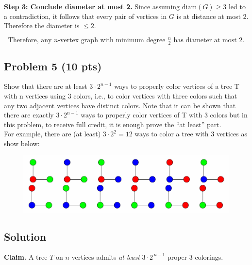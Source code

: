\documentclass[12pt]{article}
\begin{document}
\bigskip
\textbf{Step 3: Conclude diameter at most 2.}
Since assuming \(\mathrm{diam}(G)\ge3\) led to a contradiction, it follows that every pair of vertices in \(G\) is at distance at most 2. Therefore the diameter is \(\le2\).

\[
\boxed{\text{Therefore, any }n\text{-vertex graph with minimum degree }\tfrac{n}{2}
\text{ has diameter at most }2.}
\]

\subsection*{Problem 5 (10 pts)}
Show that there are at least $3\cdot2^{n-1}$ ways to properly color vertices of a tree T with n vertices using 3 colors, i.e., to color vertices with three colors such that any two adjacent vertices have  distinct colors. Note that it can be shown that there are exactly $3\cdot2^{n-1}$ ways to properly color vertices of T with 3 colors but in this problem, to receive full credit, it is enough prove the “at least” part.\\
For example, there are (at least) $3\cdot2^2 = 12$ ways to color a tree with 3 vertices as show below:

\begin{figure}[H]
    \centering
    \includegraphics[width=0.8\linewidth]{P5.png}
    \label{fig:3-color-graph}
\end{figure}

\subsection*{Solution}

\noindent
\textbf{Claim.} A tree \(T\) on \(n\) vertices admits \emph{at least} \(3 \cdot 2^{\,n-1}\) proper 3-colorings.
\end{document}
